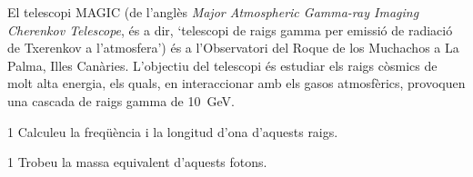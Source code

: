 El telescopi MAGIC (de l'anglès \textit{Major Atmospheric Gamma-ray Imaging Cherenkov Telescope}, és a dir, `telescopi de raigs gamma per emissió de radiació de Txerenkov a l'atmosfera') és a l'Observatori del Roque de los Muchachos a La Palma, Illes Canàries. L'objectiu del telescopi és estudiar els raigs còsmics de molt alta energia, els quals, en interaccionar amb els gasos atmosfèrics, provoquen una cascada de raigs gamma de 10~GeV.

\begin{apartat}{1}
Calculeu la freqüència i la longitud d'ona d'aquests raigs.
\end{apartat}

\begin{apartat}{1}
Trobeu la massa equivalent d'aquests fotons.
\end{apartat}

